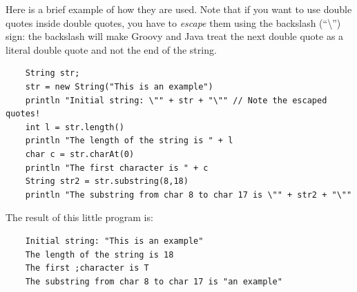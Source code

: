Here is a brief example of how they are used. Note that if you want to
use double quotes inside double quotes, you have to \emph{escape} them
using the backslash (``\textbackslash'') sign: the backslash will make
Groovy and Java treat the next double quote as a literal double quote
and not the end of the string. 

\begin{verbatim}
    String str;
    str = new String("This is an example")
    println "Initial string: \"" + str + "\"" // Note the escaped quotes!
    int l = str.length()
    println "The length of the string is " + l
    char c = str.charAt(0)
    println "The first character is " + c
    String str2 = str.substring(8,18)
    println "The substring from char 8 to char 17 is \"" + str2 + "\""
\end{verbatim}

The result of this little program is:

\begin{verbatim}
    Initial string: "This is an example"
    The length of the string is 18
    The first ;character is T
    The substring from char 8 to char 17 is "an example"
\end{verbatim}






